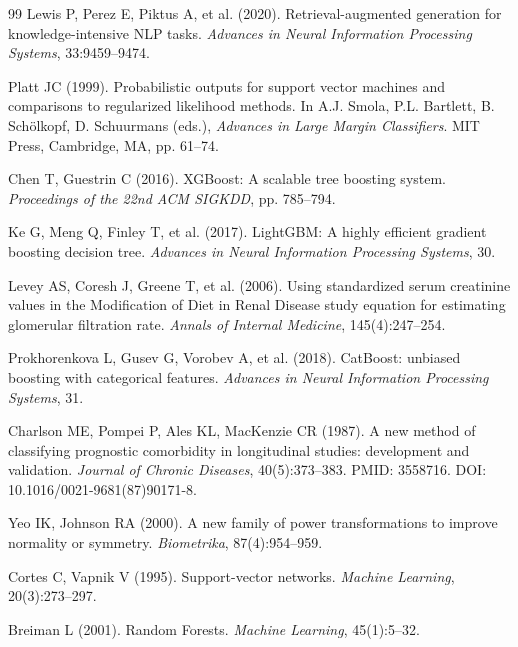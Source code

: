 \documentclass[12pt,a4paper,twoside]{report}
\begin{document}
\begin{thebibliography}{99}
Lewis P, Perez E, Piktus A, et al. (2020).
\newblock Retrieval-augmented generation for knowledge-intensive NLP tasks.
\newblock \textit{Advances in Neural Information Processing Systems}, 33:9459--9474.

Platt JC (1999).
\newblock Probabilistic outputs for support vector machines and comparisons to regularized likelihood methods.
\newblock In A.J. Smola, P.L. Bartlett, B. Schölkopf, D. Schuurmans (eds.), \textit{Advances in Large Margin Classifiers}. MIT Press, Cambridge, MA, pp. 61--74.

Chen T, Guestrin C (2016).
\newblock XGBoost: A scalable tree boosting system.
\newblock \textit{Proceedings of the 22nd ACM SIGKDD}, pp. 785--794.

Ke G, Meng Q, Finley T, et al. (2017).
\newblock LightGBM: A highly efficient gradient boosting decision tree.
\newblock \textit{Advances in Neural Information Processing Systems}, 30.

Levey AS, Coresh J, Greene T, et al. (2006).
\newblock Using standardized serum creatinine values in the Modification of Diet in Renal Disease study equation for estimating glomerular filtration rate.
\newblock \textit{Annals of Internal Medicine}, 145(4):247--254.

Prokhorenkova L, Gusev G, Vorobev A, et al. (2018).
\newblock CatBoost: unbiased boosting with categorical features.
\newblock \textit{Advances in Neural Information Processing Systems}, 31.

Charlson ME, Pompei P, Ales KL, MacKenzie CR (1987).
\newblock A new method of classifying prognostic comorbidity in longitudinal studies: development and validation.
\newblock \textit{Journal of Chronic Diseases}, 40(5):373--383.
\newblock PMID: 3558716. DOI: 10.1016/0021-9681(87)90171-8.

Yeo IK, Johnson RA (2000).
\newblock A new family of power transformations to improve normality or symmetry.
\newblock \textit{Biometrika}, 87(4):954--959.

Cortes C, Vapnik V (1995).
\newblock Support-vector networks.
\newblock \textit{Machine Learning}, 20(3):273--297.

Breiman L (2001).
\newblock Random Forests.
\newblock \textit{Machine Learning}, 45(1):5--32.


\end{thebibliography}
\end{document}
